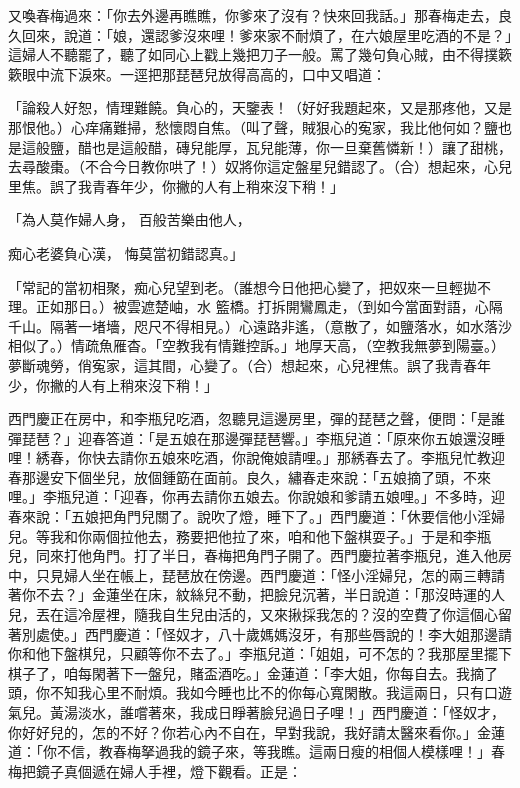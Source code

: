 \begin{showcontents}{}
又喚春梅過來：「你去外邊再瞧瞧，你爹來了沒有？快來回我話。」那春梅走去，良久回來，說道：「娘，還認爹沒來哩！爹來家不耐煩了，在六娘屋里吃酒的不是？」這婦人不聽罷了，聽了如同心上戳上幾把刀子一般。罵了幾句負心賊，由不得撲簌簌眼中流下淚來。一逕把那琵琶兒放得高高的，口中又唱道：

「論殺人好恕，情理難饒。負心的，天鑒表！（好好我題起來，又是那疼他，又是那恨他。）心痒痛難掃，愁懷悶自焦。（叫了聲，賊狠心的寃家，我比他何如？鹽也是這般鹽，醋也是這般醋，磚兒能厚，瓦兒能薄，你一旦棄舊憐新！）讓了甜桃，去尋酸棗。（不合今日教你哄了！）奴將你這定盤星兒錯認了。（合）想起來，心兒里焦。誤了我青春年少，你撇的人有上稍來沒下稍！」

「為人莫作婦人身，  百般苦樂由他人，

痴心老婆負心漢，  悔莫當初錯認真。」

「常記的當初相聚，痴心兒望到老。（誰想今日他把心變了，把奴來一旦輕拋不理。正如那日。）被雲遮楚岫，水 籃橋。打拆開鸞鳳走，（到如今當面對語，心隔千山。隔著一堵墻，咫尺不得相見。）心遠路非遙，（意散了，如鹽落水，如水落沙相似了。）情疏魚雁杳。「空教我有情難控訴。」地厚天高，（空教我無夢到陽臺。）夢斷魂勞，俏寃家，這其間，心變了。（合）想起來，心兒裡焦。誤了我青春年少，你撇的人有上稍來沒下稍！」

西門慶正在房中，和李瓶兒吃酒，忽聽見這邊房里，彈的琵琶之聲，便問：「是誰彈琵琶？」迎春答道：「是五娘在那邊彈琵琶響。」李瓶兒道：「原來你五娘還沒睡哩！綉春，你快去請你五娘來吃酒，你說俺娘請哩。」那綉春去了。李瓶兒忙教迎春那邊安下個坐兒，放個鍾筯在面前。良久，繡春走來說：「五娘摘了頭，不來哩。」李瓶兒道：「迎春，你再去請你五娘去。你說娘和爹請五娘哩。」不多時，迎春來說：「五娘把角門兒關了。說吹了燈，睡下了。」西門慶道：「休要信他小淫婦兒。等我和你兩個拉他去，務要把他拉了來，咱和他下盤棋耍子。」于是和李瓶兒，同來打他角門。打了半日，春梅把角門子開了。西門慶拉著李瓶兒，進入他房中，只見婦人坐在帳上，琵琶放在傍邊。西門慶道：「怪小淫婦兒，怎的兩三轉請著你不去？」金蓮坐在床，紋絲兒不動，把臉兒沉著，半日說道：「那沒時運的人兒，丟在這冷屋裡，隨我自生兒由活的，又來揪採我怎的？沒的空費了你這個心留著別處使。」西門慶道：「怪奴才，八十歲媽媽沒牙，有那些唇說的！李大姐那邊請你和他下盤棋兒，只顧等你不去了。」李瓶兒道：「姐姐，可不怎的？我那屋里擺下棋子了，咱每閑著下一盤兒，賭盃酒吃。」金蓮道：「李大姐，你每自去。我摘了頭，你不知我心里不耐煩。我如今睡也比不的你每心寬閑散。我這兩日，只有口遊氣兒。黃湯淡水，誰嚐著來，我成日睜著臉兒過日子哩！」西門慶道：「怪奴才，你好好兒的，怎的不好？你若心內不自在，早對我說，我好請太醫來看你。」金蓮道：「你不信，教春梅拏過我的鏡子來，等我瞧。這兩日瘦的相個人模樣哩！」春梅把鏡子真個遞在婦人手裡，燈下觀看。正是：


\end{showcontents}
